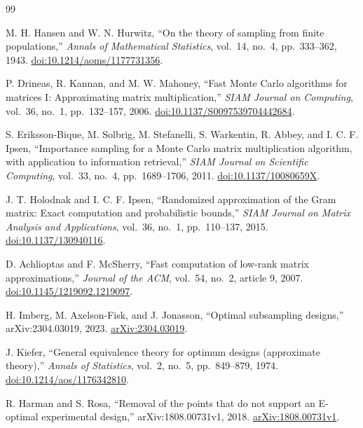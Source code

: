 \documentclass[11pt]{article}
\theoremstyle{definition}
\begin{document}
\begin{thebibliography}{99}

M. H. Hansen and W. N. Hurwitz,
``On the theory of sampling from finite populations,''
\emph{Annals of Mathematical Statistics}, vol.~14, no.~4, pp.~333--362, 1943.
\href{https://doi.org/10.1214/aoms/1177731356}{doi:10.1214/aoms/1177731356}.

P. Drineas, R. Kannan, and M. W. Mahoney,
``Fast Monte Carlo algorithms for matrices I: Approximating matrix multiplication,''
\emph{SIAM Journal on Computing}, vol.~36, no.~1, pp.~132--157, 2006.
\href{https://doi.org/10.1137/S0097539704442684}{doi:10.1137/S0097539704442684}.

S. Eriksson-Bique, M. Solbrig, M. Stefanelli, S. Warkentin, R. Abbey, and I. C. F. Ipsen,
``Importance sampling for a Monte Carlo matrix multiplication algorithm, with application to
information retrieval,''
\emph{SIAM Journal on Scientific Computing}, vol.~33, no.~4, pp.~1689--1706, 2011.
\href{https://doi.org/10.1137/10080659X}{doi:10.1137/10080659X}.

J. T. Holodnak and I. C. F. Ipsen,
``Randomized approximation of the Gram matrix: Exact computation and probabilistic bounds,''
\emph{SIAM Journal on Matrix Analysis and Applications}, vol.~36, no.~1, pp.~110--137, 2015.
\href{https://doi.org/10.1137/130940116}{doi:10.1137/130940116}.

D. Achlioptas and F. McSherry,
``Fast computation of low-rank matrix approximations,''
\emph{Journal of the ACM}, vol.~54, no.~2, article 9, 2007.
\href{https://doi.org/10.1145/1219092.1219097}{doi:10.1145/1219092.1219097}.

H. Imberg, M. Axelson-Fisk, and J. Jonasson,
``Optimal subsampling designs,'' arXiv:2304.03019, 2023.
\href{https://arxiv.org/abs/2304.03019}{arXiv:2304.03019}.

J. Kiefer,
``General equivalence theory for optimum designs (approximate theory),''
\emph{Annals of Statistics}, vol.~2, no.~5, pp.~849--879, 1974.
\href{https://doi.org/10.1214/aos/1176342810}{doi:10.1214/aos/1176342810}.

R. Harman and S. Rosa,
``Removal of the points that do not support an E-optimal experimental design,''
arXiv:1808.00731v1, 2018.
\href{https://arxiv.org/abs/1808.00731v1}{arXiv:1808.00731v1}.


\end{thebibliography}
\end{document}

